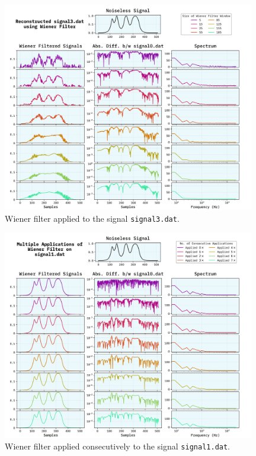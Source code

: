 \documentclass[10pt, titlepage, a4paper]{article}
\begin{document}
\begin{figure}[H]
    \centering
    \includegraphics[width=0.98\textwidth]{../WienerFilter/Images/reconstructed-signal3.dat.png}
    \caption{Wiener filter applied to the signal \texttt{signal3.dat}.}
    \label{fig:wiener-filter-3}
\end{figure}


\begin{figure}[H]
    \centering
    \includegraphics[width=0.98\textwidth]{../WienerFilter/Images/multiple-signal1.dat.png}
    \caption{Wiener filter applied consecutively to the signal \texttt{signal1.dat}.}
    \label{fig:wiener-filter-1-2}
\end{figure}
\end{document}
